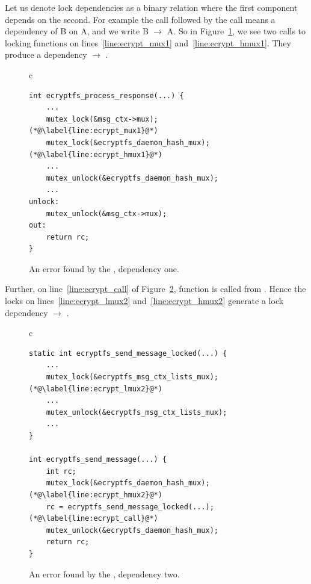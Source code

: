 Let us denote lock dependencies as a binary relation where the first component
depends on the second. For example the call  followed by the
call  means a dependency of B on A, and we write B $\rightarrow$
A. So in Figure~\ref{fig:stan_tc_bug1}, we see two calls to locking functions
on lines~\ref{line:ecrypt_mux1} and~\ref{line:ecrypt_hmux1}. They produce a
dependency  $\rightarrow$ .
\begin{figure}[htb]
  \begin{center}
  \begin{tabular}{c}
  \begin{lstlisting}[name=stan_tc_bug]
int ecryptfs_process_response(...) {
	...
	mutex_lock(&msg_ctx->mux);(*@\label{line:ecrypt_mux1}@*)
	mutex_lock(&ecryptfs_daemon_hash_mux);(*@\label{line:ecrypt_hmux1}@*)
	...
	mutex_unlock(&ecryptfs_daemon_hash_mux);
	...
unlock:
	mutex_unlock(&msg_ctx->mux);
out:
	return rc;
}
  \end{lstlisting}
  \end{tabular}
  \end{center}
    \caption{An error found by the \TC, dependency one.}
    \label{fig:stan_tc_bug1}
\end{figure}

Further, on line~\ref{line:ecrypt_call} of Figure~\ref{fig:stan_tc_bug2},
function  is called from
. Hence the locks on lines~\ref{line:ecrypt_lmux2}
and~\ref{line:ecrypt_hmux2} generate a lock dependency
$\rightarrow$
.
\begin{figure}[htb]
  \begin{center}
  \begin{tabular}{c}
  \begin{lstlisting}[name=stan_tc_bug]
static int ecryptfs_send_message_locked(...) {
	...
	mutex_lock(&ecryptfs_msg_ctx_lists_mux);(*@\label{line:ecrypt_lmux2}@*)
	...
	mutex_unlock(&ecryptfs_msg_ctx_lists_mux);
	...
}

int ecryptfs_send_message(...) {
	int rc;
	mutex_lock(&ecryptfs_daemon_hash_mux);(*@\label{line:ecrypt_hmux2}@*)
	rc = ecryptfs_send_message_locked(...);(*@\label{line:ecrypt_call}@*)
	mutex_unlock(&ecryptfs_daemon_hash_mux);
	return rc;
}
  \end{lstlisting}
  \end{tabular}
  \end{center}
    \caption{An error found by the \TC, dependency two.}
    \label{fig:stan_tc_bug2}
\end{figure}

